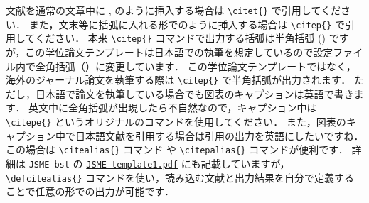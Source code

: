 文献を通常の文章中に \citet{Matsukawa:PoF2022}, \citet{松川:流力年会2022} のように挿入する場合は \verb|\citet{}| で引用してください．
また，文末等に括弧に入れる形で\citep{Matsukawa:PoF2022,松川:流力年会2022}のように挿入する場合は \verb|\citep{}| で引用してください．
本来 \verb|\citep{}| コマンドで出力する括弧は半角括弧 () ですが，この学位論文テンプレートは日本語での執筆を想定しているので設定ファイル内で全角括弧（）に変更しています．
この学位論文テンプレートではなく，海外のジャーナル論文を執筆する際は \verb|\citep{}| で半角括弧が出力されます．
ただし，日本語で論文を執筆している場合でも図表のキャプションは英語で書きます．
英文中に全角括弧が出現したら不自然なので，キャプション中は \verb|\citepe{}| というオリジナルのコマンドを使用してください．
また，図表のキャプション中で日本語文献を引用する場合は引用の出力を英語にしたいですね．
この場合は \verb|\citealias{}| コマンド や \verb|\citepalias{}| コマンドが便利です．
詳細は \verb|JSME-bst| の \href{https://github.com/Yuki-MATSUKAWA/JSME-bst/blob/main/JSME-template1.pdf}{\texttt{JSME-template1.pdf}} にも記載していますが，\verb|\defcitealias{}| コマンドを使い，読み込む文献と出力結果を自分で定義することで任意の形での出力が可能です．




